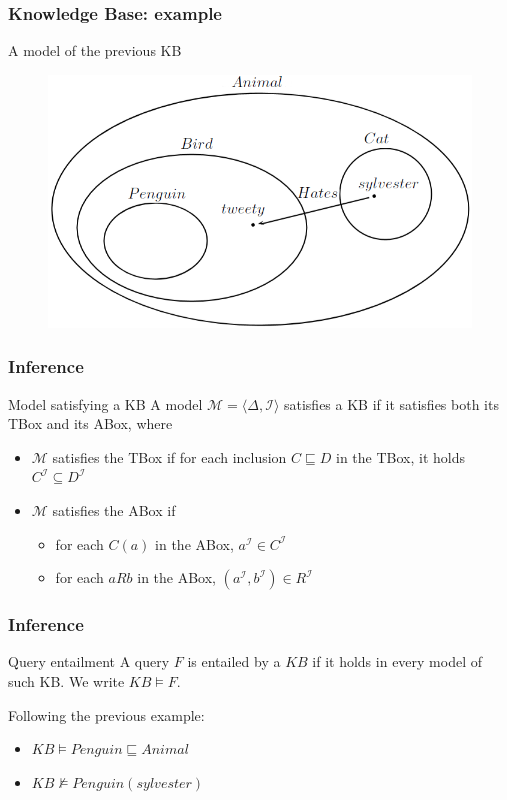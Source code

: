 \documentclass[serif,mathserif]{beamer}
\begin{document}
\begin{frame}
	\frametitle{Knowledge Base: example}

	A model of the previous KB
	\begin{figure}[htp]
	\centering
	\includegraphics[scale=0.30]{img/diagram1_5.png}
	\end{figure}
\end{frame}

\begin{frame}
	\frametitle{Inference}
	\begin{block}{Model satisfying a KB}
	A model $\mathcal{M} = \langle \Delta, \mathcal{I} \rangle$ satisfies a KB if it satisfies both its TBox and its ABox, where
	\begin{itemize}
		\item $\mathcal{M}$ satisfies the TBox if for each inclusion $C \sqsubseteq D$ in the TBox, it holds $C^\mathcal{I} \subseteq D^\mathcal{I}$
		
		\item $\mathcal{M}$ satisfies the ABox if
		\begin{itemize} 
			\item for each $C(a)$ in the ABox, $a^\mathcal{I} \in C^\mathcal{I}$
			\item for each $aRb$ in the ABox, $(a^\mathcal{I}, b^\mathcal{I}) \in R^\mathcal{I}$
		\end{itemize}
	\end{itemize}
	\end{block}
\end{frame}
\begin{frame}
	\frametitle{Inference}	
	\begin{block}{Query entailment}
	A query $F$ is entailed by a $KB$ if it holds in every model of such KB. We write $KB \models F$.
	\end{block}
	
	\begin{example}
	Following the previous example:
	\begin{itemize}
		\item $KB \models Penguin \sqsubseteq Animal$
		\item $KB \not\models Penguin(sylvester)$
	\end{itemize}
	\end{example}
\end{frame}
\end{document}
